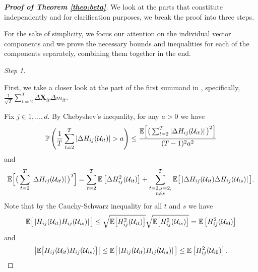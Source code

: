 \documentclass[a4paper,12pt]{article}
\makeatletter
\renewcommand{\eqref}[1]{\tagform@{\ref{#1}}}
\makeatother
\begin{document}
\begin{proof}[\textnormal{\textbf{Proof of Theorem \ref{theo:beta}}}]
We look at the parts that constitute \eqref{theo:beta:proof1} independently and for clarification purposes, we break the proof into three steps.

For the sake of simplicity, we focus our attention on the individual vector components and we prove the necessary bounds and inequalities for each of the components separately, combining them together in the end.

{\it Step 1.}

First, we take a closer look at the part of the first summand in \eqref{theo:beta:proof1}, specifically, $\frac{1}{\sqrt{T}}\sum_{t=2}^T \Delta \mathbf{X}_{it} \Delta m_{it}$. 

Fix $j \in {1, \ldots, d}$. By Chebyshev's inequality, for any $a > 0$ we have
\begin{align}\label{theo-regs-proof-3}
\mathbb{P} \left(\frac{1}{T} \sum_{t=2}^T \left|\Delta  H_{ij} (\mathcal{U}_{it})\right| > a \right) \leq \frac{\mathbb{E} \Big[ \big(\sum_{t=2}^T \left|\Delta  H_{ij} (\mathcal{U}_{it})\right|\big)^2 \Big]}{(T-1)^2 a^2}
\end{align}
and 
\begin{align}\label{theo-regs-proof-4}
\begin{split}
\mathbb{E} \Big[ \big( \sum_{t=2}^T \left|\Delta  H_{ij} (\mathcal{U}_{it})\right|\big)^2 \Big] =  \sum_{t=2}^T \mathbb{E} \left[ \Delta  H^2_{ij} (\mathcal{U}_{it})  \right] + \sum_{\substack{{t=2}, s = 2,\\ t\neq s}}^T\mathbb{E} \big[ \left|\Delta  H_{ij} (\mathcal{U}_{it}) \Delta  H_{ij} (\mathcal{U}_{is})\right| \big].
\end{split}
\end{align}
Note that by the Cauchy-Schwarz inequality for all $t$ and $s$ we have
\begin{align}\label{theo:beta:proof5}
 \mathbb{E} \big[ \left| H_{ij}(\mathcal{U}_{it}) H_{ij}(\mathcal{U}_{is})\right| \big] \leq \sqrt{\mathbb{E}\big[ H^2_{ij}(\mathcal{U}_{it})\big]} \sqrt{ \mathbb{E} \big[H^2_{ij}(\mathcal{U}_{is})\big]} = \mathbb{E} \left[ H^2_{ij}(\mathcal{U}_{i0}) \right] 
\end{align}
and 
\begin{align*}
 \left|\mathbb{E} \big[ H_{ij}(\mathcal{U}_{it}) H_{ij}(\mathcal{U}_{is}) \big]\right|\leq \mathbb{E} \big[ \left| H_{ij}(\mathcal{U}_{it}) H_{ij}(\mathcal{U}_{is})\right| \big] \leq  \mathbb{E} \left[ H^2_{ij}(\mathcal{U}_{i0}) \right].
\end{align*}


\end{proof}
\end{document}
